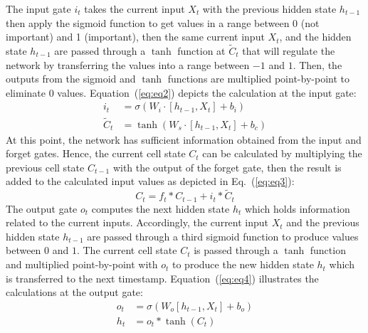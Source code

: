 The input gate \(i_{t}\) takes the current input \(X_t\) with the previous hidden state \(h_{t-1}\) then apply the sigmoid function to get values in a range between 0 (not important) and 1 (important), then the
same current input \(X_t\), and the hidden state \(h_{t-1}\) are passed through a \(\tanh\) function at \(\tilde{C}_{t}\) that will regulate the network by transferring the values into a range between \(-1\) and \(1\).
Then, the outputs from the sigmoid and \(\tanh\) functions are multiplied point-by-point to eliminate \(0\) values.  
Equation~(\ref{eq:eq2}) depicts the calculation at the input gate:
\begin{equation}
	\begin{aligned}
		i_{t} &=\sigma\left(W_{i} \cdot\left[h_{t-1}, X_{t}\right]+b_{i}\right) 
		\\
		\tilde{C}_{t} &=\tanh \left(W_{s} \cdot\left[h_{t-1}, X_{t}\right]+b_{c}\right) 
	\end{aligned} \label{eq:eq2}
\end{equation}
At this point, the network has sufficient information obtained from the input and forget gates. 
Hence, the current cell state \(C_t\) can be calculated by multiplying the previous cell state \(C_{t-1}\) with the output of the forget gate, then the result is added to the calculated input values as depicted in Eq.~(\ref{eq:eq3}): 
\begin{equation}
	C_{t}=f_{t} * C_{t-1}+i_{t} * \tilde{C}_{t}
	\label{eq:eq3}
\end{equation}
The output gate \(o_{t}\) computes the next hidden state \(h_{t}\) which
holds information related to the current inputs. 
Accordingly, the current input \(X_{t}\) and the previous hidden state \(h_{t-1}\) are passed through a third sigmoid function to produce values between \(0\) and \(1\).
The current cell state \(C_{t}\) is passed through a \(\tanh\) function and multiplied point-by-point with \(o_{t}\) to produce the new hidden state \(h_{t}\) which is transferred to the next timestamp.
Equation~(\ref{eq:eq4}) illustrates the calculations at the output gate:
\begin{equation}
	\begin{aligned}
		o_{t} &=\sigma\left(W_{o}\left[h_{t-1}, X_{t}\right]+b_{o}\right) \\
		h_{t} &=o_{t} * \tanh \left(C_{t}\right)
	\end{aligned}
	\label{eq:eq4}
\end{equation} 

